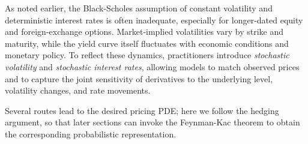 \documentclass[12pt]{report} %
\theoremstyle{plain} %
\theoremstyle{definition} %
\theoremstyle{remark} %
\begin{document}
As noted earlier, the Black-Scholes assumption of constant volatility
and deterministic interest rates is often inadequate, especially for longer-dated equity
and foreign-exchange options. Market-implied volatilities vary by strike and maturity,
while the yield curve itself fluctuates with economic conditions and monetary policy.
To reflect these dynamics, practitioners introduce \emph{stochastic volatility} and
\emph{stochastic interest rates}, allowing models to match observed prices and to capture
the joint sensitivity of derivatives to the underlying level, volatility changes,
and rate movements.

Several routes lead to the desired pricing PDE; here we follow the hedging argument,
so that later sections can invoke the Feynman-Kac theorem to obtain the corresponding
probabilistic representation.
\end{document}
